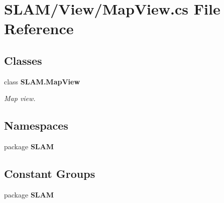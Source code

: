 \section{S\-L\-A\-M/\-View/\-Map\-View.cs File Reference}
\label{_map_view_8cs}
\subsection*{Classes}
\begin{DoxyCompactItemize}
\item 
class {\bf S\-L\-A\-M.\-Map\-View}
\begin{DoxyCompactList}\small\item\em Map view. \end{DoxyCompactList}\end{DoxyCompactItemize}
\subsection*{Namespaces}
\begin{DoxyCompactItemize}
\item 
package {\bf S\-L\-A\-M}
\end{DoxyCompactItemize}
\subsection*{Constant Groups}
\begin{DoxyCompactItemize}
\item 
package {\bf S\-L\-A\-M}
\end{DoxyCompactItemize}
